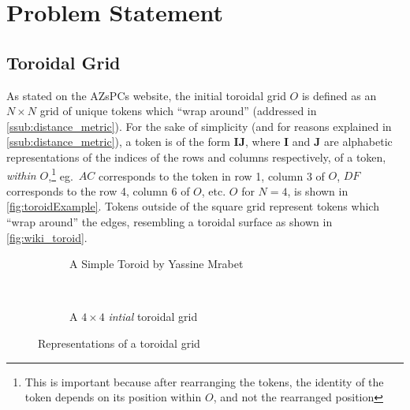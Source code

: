 \section{Problem Statement}%
\label{sec:problem_statement}

\subsection{Toroidal Grid}%
\label{sub:toroidal_grid}

As stated on the AZsPCs website,\cite{zimmermann} the initial toroidal grid $O$ is defined as an $N\times N$ grid of unique tokens which ``wrap around'' (addressed in \ref{ssub:distance_metric}). For the sake of simplicity (and for reasons explained in \ref{ssub:distance_metric}), a token is of the form $\bm{IJ}$, where $\bm{I}$ and $\bm{J}$ are alphabetic representations of the indices of the rows and columns respectively, of a token, \emph{within $O$},\footnote{This is important because after rearranging the tokens, the identity of the token depends on its position within $O$, and not the rearranged position} eg.~$AC$ corresponds to the token in row 1, column 3 of $O$, $DF$ corresponds to the row 4, column 6 of $O$, etc. $O$ for $N=4$, is shown in \autoref{fig:toroidExample}. Tokens outside of the square grid represent tokens which ``wrap around'' the edges, resembling a toroidal surface as shown in \autoref{fig:wiki_toroid}.
\begin{figure}[htpb]
    \begin{subfigure}[t]{0.5\textwidth}
    \begin{center}
    \caption{A Simple Toroid by Yassine Mrabet\cite{wiki_toroid}}
    \label{fig:wiki_toroid}
    \end{center}
    \end{subfigure}
    ~
    \begin{subfigure}[t]{0.5\textwidth}
    \begin{center}
    \caption{A $4\times 4$ \emph{intial} toroidal grid}%
    \label{fig:toroidExample}
    \end{center}
    \end{subfigure}
    \caption{Representations of a toroidal grid}
\end{figure}


